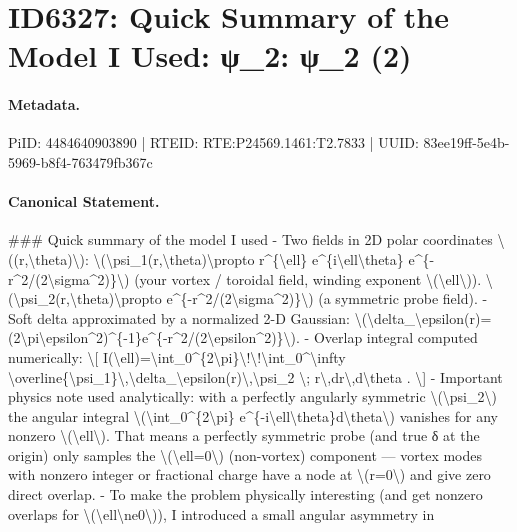 \section*{ID6327: Quick Summary of the Model I Used: ψ\_2: ψ\_2 (2)}
\paragraph{Metadata.}
PiID: 4484640903890 | RTEID: RTE:P24569.1461:T2.7833 | UUID: 83ee19ff-5e4b-5969-b8f4-763479fb367c

\paragraph{Canonical Statement.}
\#\#\# Quick summary of the model I used - Two fields in 2D polar coordinates \textbackslash{}((r,\textbackslash{}theta)\textbackslash{}): \textbackslash{}(\textbackslash{}psi\_1(r,\textbackslash{}theta)\textbackslash{}propto r\textasciicircum{}\{\textbackslash{}ell\} e\textasciicircum{}\{i\textbackslash{}ell\textbackslash{}theta\} e\textasciicircum{}\{-r\textasciicircum{}2/(2\textbackslash{}sigma\textasciicircum{}2)\}\textbackslash{}) (your vortex / toroidal field, winding exponent \textbackslash{}(\textbackslash{}ell\textbackslash{})). \textbackslash{}(\textbackslash{}psi\_2(r,\textbackslash{}theta)\textbackslash{}propto e\textasciicircum{}\{-r\textasciicircum{}2/(2\textbackslash{}sigma\textasciicircum{}2)\}\textbackslash{}) (a symmetric probe field). - Soft delta approximated by a normalized 2-D Gaussian: \textbackslash{}(\textbackslash{}delta\_\textbackslash{}epsilon(r)=(2\textbackslash{}pi\textbackslash{}epsilon\textasciicircum{}2)\textasciicircum{}\{-1\}e\textasciicircum{}\{-r\textasciicircum{}2/(2\textbackslash{}epsilon\textasciicircum{}2)\}\textbackslash{}). - Overlap integral computed numerically: \textbackslash{}[ I(\textbackslash{}ell)=\textbackslash{}int\_0\textasciicircum{}\{2\textbackslash{}pi\}\textbackslash{}!\textbackslash{}!\textbackslash{}int\_0\textasciicircum{}\textbackslash{}infty \textbackslash{}overline\{\textbackslash{}psi\_1\}\textbackslash{},\textbackslash{}delta\_\textbackslash{}epsilon(r)\textbackslash{},\textbackslash{}psi\_2 \textbackslash{}; r\textbackslash{},dr\textbackslash{},d\textbackslash{}theta . \textbackslash{}] - Important physics note used analytically: with a perfectly angularly symmetric \textbackslash{}(\textbackslash{}psi\_2\textbackslash{}) the angular integral \textbackslash{}(\textbackslash{}int\_0\textasciicircum{}\{2\textbackslash{}pi\} e\textasciicircum{}\{-i\textbackslash{}ell\textbackslash{}theta\}d\textbackslash{}theta\textbackslash{}) vanishes for any nonzero \textbackslash{}(\textbackslash{}ell\textbackslash{}). That means a perfectly symmetric probe (and true δ at the origin) only samples the \textbackslash{}(\textbackslash{}ell=0\textbackslash{}) (non-vortex) component — vortex modes with nonzero integer or fractional charge have a node at \textbackslash{}(r=0\textbackslash{}) and give zero direct overlap. - To make the problem physically interesting (and get nonzero overlaps for \textbackslash{}(\textbackslash{}ell\textbackslash{}ne0\textbackslash{})), I introduced a small angular asymmetry in 